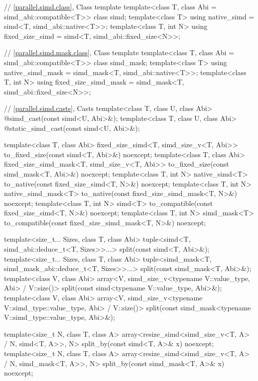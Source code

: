 \begin{codeblock}
{{  // \ref{parallel.simd.class}, Class template 
  template<class T, class Abi = simd_abi::compatible<T>> class simd;
  template<class T> using native_simd = simd<T, simd_abi::native<T>>;
  template<class T, int N> using fixed_size_simd = simd<T, simd_abi::fixed_size<N>>;

  // \ref{parallel.simd.mask.class}, Class template 
  template<class T, class Abi = simd_abi::compatible<T>> class simd_mask;
  template<class T> using native_simd_mask = simd_mask<T, simd_abi::native<T>>;
  template<class T, int N> using fixed_size_simd_mask =
    simd_mask<T, simd_abi::fixed_size<N>>;

  // \ref{parallel.simd.casts}, Casts
  template<class T, class U, class Abi> @\seebelow@ simd_cast(const simd<U, Abi>&);
  template<class T, class U, class Abi> @\seebelow@ static_simd_cast(const simd<U, Abi>&);

  template<class T, class Abi>
    fixed_size_simd<T, simd_size_v<T, Abi>>
      to_fixed_size(const simd<T, Abi>&) noexcept;
  template<class T, class Abi>
    fixed_size_simd_mask<T, simd_size_v<T, Abi>>
      to_fixed_size(const simd_mask<T, Abi>&) noexcept;
  template<class T, int N>
    native_simd<T> to_native(const fixed_size_simd<T, N>&) noexcept;
  template<class T, int N>
    native_simd_mask<T> to_native(const fixed_size_simd_mask<T, N>&) noexcept;
  template<class T, int N>
    simd<T> to_compatible(const fixed_size_simd<T, N>&) noexcept;
  template<class T, int N>
    simd_mask<T> to_compatible(const fixed_size_simd_mask<T, N>&) noexcept;

  template<size_t... Sizes, class T, class Abi>
    tuple<simd<T, simd_abi::deduce_t<T, Sizes>>...>
      split(const simd<T, Abi>&);
  template<size_t... Sizes, class T, class Abi>
    tuple<simd_mask<T, simd_mask_abi::deduce_t<T, Sizes>>...>
      split(const simd_mask<T, Abi>&);
  template<class V, class Abi>
    array<V, simd_size_v<typename V::value_type, Abi> / V::size()>
      split(const simd<typename V::value_type, Abi>&);
  template<class V, class Abi>
    array<V, simd_size_v<typename V::simd_type::value_type, Abi> / V::size()>
      split(const simd_mask<typename V::simd_type::value_type, Abi>&);

  template<size_t N, class T, class A>
    array<resize_simd<simd_size_v<T, A> / N, simd<T, A>>, N>
      split_by(const simd<T, A>& x) noexcept;
  template<size_t N, class T, class A>
    array<resize_simd<simd_size_v<T, A> / N, simd_mask<T, A>>, N>
      split_by(const simd_mask<T, A>& x) noexcept;

}}
\end{codeblock}
